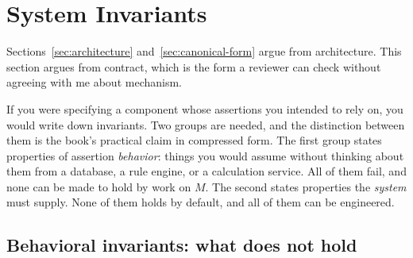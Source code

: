 \chapter{System Invariants}
\label{ch:invariants}
\label{sec:invariants}

Sections~\ref{sec:architecture} and~\ref{sec:canonical-form} argue from
architecture. This section argues from contract, which is the form a reviewer can
check without agreeing with me about mechanism.

If you were specifying a component whose assertions you intended to rely on, you
would write down invariants. Two groups are needed, and the distinction between
them is the book's practical claim in compressed form. The first group states
properties of assertion \emph{behavior}: things you would assume without thinking
about them from a database, a rule engine, or a calculation service. All of them
fail, and none can be made to hold by work on $M$. The second states properties the
\emph{system} must supply. None of them holds by default, and all of them can be
engineered.

\section{Behavioral invariants: what does not hold}

